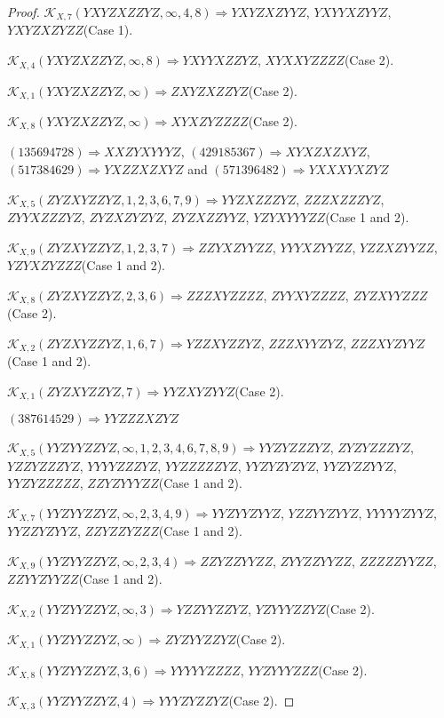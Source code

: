 \documentclass[12pt]{article}
\theoremstyle{plain}
\theoremstyle{definition}
\theoremstyle{remark}
\newcommand{\fancy}[1]{\mathcal{#1}}
\def\K{\fancy{K}}
\begin{document}
\begin{proof}
	$\K_{X,7}(YXYZXZZYZ,\infty,4, 8)\Rightarrow $$YXYZXZYYZ$, $YXYYXZYYZ$, $YXYZXZYZZ$(Case 1).
	
	$\K_{X,4}(YXYZXZZYZ,\infty,8)\Rightarrow $$YXYYXZZYZ$, $XYXXYZZZZ$(Case 2).
	
	$\K_{X,1}(YXYZXZZYZ,\infty)\Rightarrow $$ZXYZXZZYZ$(Case 2).
	
	$\K_{X,8}(YXYZXZZYZ,\infty)\Rightarrow $$XYXZYZZZZ$(Case 2).
	
	
	
	$(1 3 5 6 9 4 7 2 8)\Rightarrow XXZYXYYYZ$, $(4 2 9 1 8 5 3 6 7)\Rightarrow XYXZXZXYZ$, $(5 1 7 3 8 4 6 2 9)\Rightarrow YXZZXZXYZ$ and $(5 7 1 3 9 6 4 8 2)\Rightarrow YXXXYXZYZ$
	
	
	$\K_{X,5}(ZYZXYZZYZ,1, 2, 3, 6, 7, 9)\Rightarrow $$YYZXZZZYZ$, $ZZZXZZZYZ$, $ZYYXZZZYZ$, $ZYZXZYZYZ$, $ZYZXZZYYZ$, $YZYXYYYZZ$(Case 1 and 2).
	
	$\K_{X,9}(ZYZXYZZYZ,1, 2, 3, 7)\Rightarrow $$ZZYXZYYZZ$, $YYYXZYYZZ$, $YZZXZYYZZ$, $YZYXZYZZZ$(Case 1 and 2).
	
	$\K_{X,8}(ZYZXYZZYZ,2, 3, 6)\Rightarrow $$ZZZXYZZZZ$, $ZYYXYZZZZ$, $ZYZXYYZZZ$(Case 2).
	
	$\K_{X,2}(ZYZXYZZYZ,1, 6, 7)\Rightarrow $$YZZXYZZYZ$, $ZZZXYYZYZ$, $ZZZXYZYYZ$(Case 1 and 2).
	
	$\K_{X,1}(ZYZXYZZYZ,7)\Rightarrow $$YYZXYZYYZ$(Case 2).
	
	
	
	$(3 8 7 6 1 4 5 2 9)\Rightarrow YYZZZXZYZ$
	
	
	$\K_{X,5}(YYZYYZZYZ,\infty,1, 2, 3, 4, 6, 7, 8, 9)\Rightarrow $$YYZYZZZYZ$, $ZYZYZZZYZ$, $YZZYZZZYZ$, $YYYYZZZYZ$, $YYZZZZZYZ$, $YYZYZYZYZ$, $YYZYZZYYZ$, $YYZYZZZZZ$, $ZZYZYYYZZ$(Case 1 and 2).
	
	$\K_{X,7}(YYZYYZZYZ,\infty,2, 3, 4, 9)\Rightarrow $$YYZYYZYYZ$, $YZZYYZYYZ$, $YYYYYZYYZ$, $YYZZYZYYZ$, $ZZYZZYZZZ$(Case 1 and 2).
	
	$\K_{X,9}(YYZYYZZYZ,\infty,2, 3, 4)\Rightarrow $$ZZYZZYYZZ$, $ZYYZZYYZZ$, $ZZZZZYYZZ$, $ZZYYZYYZZ$(Case 1 and 2).
	
	$\K_{X,2}(YYZYYZZYZ,\infty,3)\Rightarrow $$YZZYYZZYZ$, $YZYYYZZYZ$(Case 2).
	
	$\K_{X,1}(YYZYYZZYZ,\infty)\Rightarrow $$ZYZYYZZYZ$(Case 2).
	
	$\K_{X,8}(YYZYYZZYZ,3, 6)\Rightarrow $$YYYYYZZZZ$, $YYZYYYZZZ$(Case 2).
	
	$\K_{X,3}(YYZYYZZYZ,4)\Rightarrow $$YYYZYZZYZ$(Case 2).
	
	
	

\end{proof}
\end{document}
